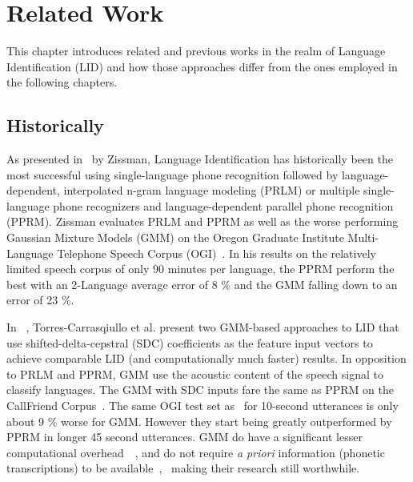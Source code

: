 

\chapter{Related Work}
\label{ch:Related Work}
This chapter introduces related and previous works in the realm of Language Identification (LID) and how those approaches differ from the ones employed in the following chapters.

\section{Historically}

As presented in~\cite{zissman1996comparison} by Zissman, Language Identification has historically been the most successful using single-language phone recognition followed by language-dependent, interpolated n-gram language modeling (PRLM) or multiple single-language phone recognizers and language-dependent parallel phone recognition (PPRM). Zissman evaluates PRLM and PPRM as well as the worse performing Gaussian Mixture Models (GMM) on the Oregon Graduate Institute Multi-Language Telephone Speech Corpus (OGI)~\cite{muthusamy1992ogi}. 
In his results on the relatively limited speech corpus of only 90 minutes per language, the PPRM perform the best with an 2-Language average error of 8 \% and the GMM falling down to an error of 23 \%.

In ~\cite{torres2002approaches}, Torres-Carrasqiullo et al. present two GMM-based approaches to LID that use shifted-delta-cepstral (SDC) coefficients as the feature input vectors to achieve comparable LID (and computationally much faster) results. In opposition to PRLM and PPRM, GMM use the acoustic content of the speech signal to classify languages. The GMM with SDC inputs fare the same as PPRM on the CallFriend Corpus~\cite{callfriend1996}. The same OGI test set as~\cite{zissman1996comparison} for 10-second utterances is only about 9 \% worse for GMM. However they start being greatly outperformed by PPRM in longer 45 second utterances. GMM do have a significant lesser computational overhead~\cite{zissman1996comparison}~\cite{torres2002approaches}, and do not require \textit{a priori} information (phonetic transcriptions) to be available~\cite{zissman2001automatic},~\cite{zissman1996comparison} making their research still worthwhile.

